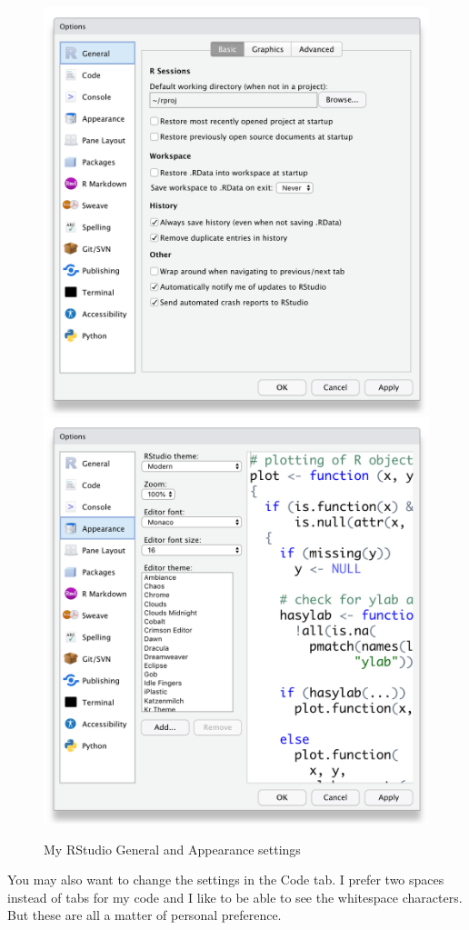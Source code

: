 \documentclass[
]{book}
\begin{document}
\begin{figure}

{\centering \includegraphics[width=0.45\linewidth]{images/rstudio_settings_general} \includegraphics[width=0.45\linewidth]{images/rstudio_settings_appearance} 

}

\caption{My RStudio General and Appearance settings}\label{fig:settings-general}
\end{figure}

You may also want to change the settings in the Code tab. I prefer two spaces instead of tabs for my code and I like to be able to see the whitespace characters. But these are all a matter of personal preference.
\end{document}
